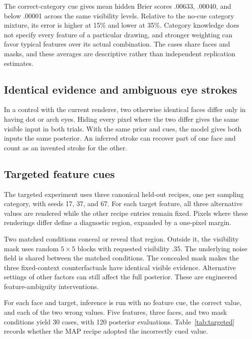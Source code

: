 \documentclass[11pt,letterpaper]{article}
\begin{document}
The correct-category cue gives mean hidden Brier scores .00633, .00040, and below .00001 across the same visibility levels. Relative to the no-cue category mixture, its error is higher at 15\% and lower at 35\%. Category knowledge does not specify every feature of a particular drawing, and stronger weighting can favor typical features over its actual combination. The cases share faces and masks, and these averages are descriptive rather than independent replication estimates.

\subsection{Identical evidence and ambiguous eye strokes}
In a control with the current renderer, two otherwise identical faces differ only in having dot or arch eyes. Hiding every pixel where the two differ gives the same visible input in both trials. With the same prior and cues, the model gives both inputs the same posterior. An inferred stroke can recover part of one face and count as an invented stroke for the other.

\subsection{Targeted feature cues}
The targeted experiment uses three canonical held-out recipes, one per sampling category, with seeds 17, 37, and 67. For each target feature, all three alternative values are rendered while the other recipe entries remain fixed. Pixels where these renderings differ define a diagnostic region, expanded by a one-pixel margin.

Two matched conditions conceal or reveal that region. Outside it, the visibility mask uses random $5\times5$ blocks with requested visibility .35. The underlying noise field is shared between the matched conditions. The concealed mask makes the three fixed-context counterfactuals have identical visible evidence. Alternative settings of other factors can still affect the full posterior. These are engineered feature-ambiguity interventions.

For each face and target, inference is run with no feature cue, the correct value, and each of the two wrong values. Five features, three faces, and two mask conditions yield 30 cases, with 120 posterior evaluations. Table~\ref{tab:targeted} records whether the MAP recipe adopted the incorrectly cued value.
\end{document}

